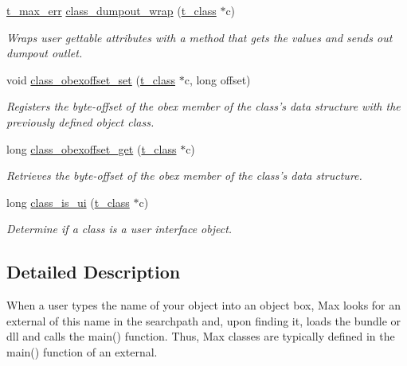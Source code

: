 \begin{DoxyCompactItemize}
\hyperlink{group__datatypes_ga73edaae82b318855cc09fac994918165}{t\_\-max\_\-err} \hyperlink{group__class_ga1b3d0a6942c49af47e3f44031d8f1097}{class\_\-dumpout\_\-wrap} (\hyperlink{structt__class}{t\_\-class} $\ast$c)
\begin{DoxyCompactList}\small\item\em Wraps user gettable attributes with a method that gets the values and sends out dumpout outlet. \item\end{DoxyCompactList}\item 
void \hyperlink{group__class_ga55ca4872991242c991b8bf6adb9bf6a6}{class\_\-obexoffset\_\-set} (\hyperlink{structt__class}{t\_\-class} $\ast$c, long offset)
\begin{DoxyCompactList}\small\item\em Registers the byte-\/offset of the obex member of the class's data structure with the previously defined object class. \item\end{DoxyCompactList}\item 
long \hyperlink{group__class_ga237b86f879e3eb3edbf674ffccc1f97c}{class\_\-obexoffset\_\-get} (\hyperlink{structt__class}{t\_\-class} $\ast$c)
\begin{DoxyCompactList}\small\item\em Retrieves the byte-\/offset of the obex member of the class's data structure. \item\end{DoxyCompactList}\item 
long \hyperlink{group__class_ga8c3f01e90f8adbc3c9b06e376d6a7fae}{class\_\-is\_\-ui} (\hyperlink{structt__class}{t\_\-class} $\ast$c)
\begin{DoxyCompactList}\small\item\em Determine if a class is a user interface object. \item\end{DoxyCompactList}\end{DoxyCompactItemize}


\subsection{Detailed Description}
When a user types the name of your object into an object box, Max looks for an external of this name in the searchpath and, upon finding it, loads the bundle or dll and calls the main() function. Thus, Max classes are typically defined in the main() function of an external.

